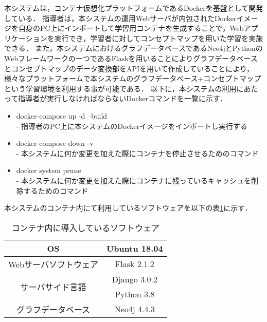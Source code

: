 本システムは，コンテナ仮想化プラットフォームであるDockerを基盤として開発している．
指導者は，本システムの運用Webサーバが内包されたDockerイメージを自身のPC上にインポートして学習用コンテナを生成することで，Webアプリケーションを実行でき，学習者に対してコンセプトマップを用いた学習を実施できる．
また，本システムにおけるグラフデータベースであるNeo4jとPythonのWebフレームワークの一つであるFlaskを用いることによりグラフデータベースとコンセプトマップのデータ変換部をAPIを用いて作成していることにより，様々なプラットフォームで本システムのグラフデータべース+コンセプトマップという学習環境を利用する事が可能である．
以下に，本システムの利用にあたって指導者が実行しなければならないDockerコマンドを一覧に示す．

\begin{itemize}
    \item docker-compose up -d --build\\
    - 指導者のPC上に本システムのDockerイメージをインポートし実行する
    
    \item docker-compose down -v\\
    - 本システムに何か変更を加えた際にコンテナを停止させるためのコマンド

    \item docker system prune\\
    - 本システムに何か変更を加えた際にコンテナに残っているキャッシュを削除するためのコマンド
    
\end{itemize}

本システムのコンテナ内にて利用しているソフトウェアを以下の表\ref{tab:docker_software}に示す．
\begin{table}[htb]
    \centering
    \caption{コンテナ内に導入しているソフトウェア}
    \label{tab:docker_software}
    \begin{tabular}{|c|c|}  \hline
        OS & Ubuntu 18.04 \\ \hline
		Webサーバソフトウェア & Flask 2.1.2 \\ \hline
		\multirow{2}{*}{サーバサイド言語} & Django 3.0.2 \\
		              & Python 3.8 \\ \hline
		グラフデータベース & Neo4j 4.4.3 \\ \hline		  
    \end{tabular}
\end{table}
\newpage